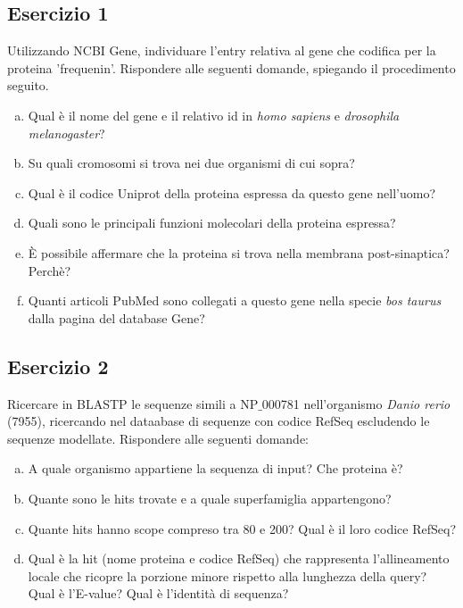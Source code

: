 \documentclass{article}
\begin{document}
\subsection*{Esercizio 1}
Utilizzando NCBI Gene, individuare l'entry relativa al gene che codifica per la proteina 'frequenin'. Rispondere alle seguenti domande, spiegando il procedimento seguito.
\begin{enumerate}[a)]
   \item Qual è il nome del gene e il relativo id in \textit{homo sapiens} e \textit{drosophila melanogaster}?
   \item Su quali cromosomi si trova nei due organismi di cui sopra?
   \item Qual è il codice Uniprot della proteina espressa da questo gene nell'uomo?
   \item Quali sono le principali funzioni molecolari della proteina espressa?
   \item È possibile affermare che la proteina si trova nella membrana post-sinaptica? Perchè?
   \item Quanti articoli PubMed sono collegati a questo gene nella specie \textit{bos taurus} dalla pagina del database Gene?
\end{enumerate}
\subsection*{Esercizio 2}
Ricercare in BLASTP le sequenze simili a NP$\_$000781 nell'organismo \textit{Danio rerio} (7955), ricercando nel dataabase di sequenze con codice RefSeq escludendo le sequenze modellate. Rispondere alle seguenti domande:
\begin{enumerate}[a)]
   \item A quale organismo appartiene la sequenza di input? Che proteina è?
   \item Quante sono le hits trovate e a quale superfamiglia appartengono?
   \item Quante hits hanno scope compreso tra 80 e 200? Qual è il loro codice RefSeq?
   \item Qual è la hit (nome proteina e codice RefSeq) che rappresenta l'allineamento locale che ricopre la porzione minore rispetto alla lunghezza della query? Qual è l'E-value? Qual è l'identità di sequenza?
\end{enumerate}
\end{document}
